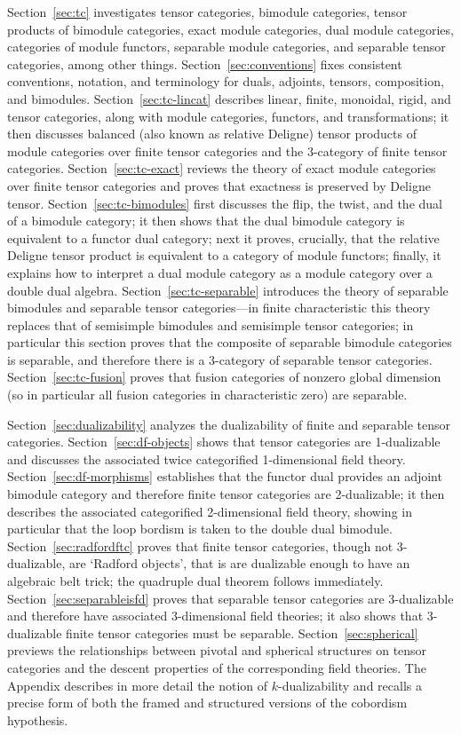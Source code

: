 \documentclass{amsart}
\begin{document}
Section~\ref{sec:tc} investigates tensor categories, bimodule categories, tensor products of bimodule categories, exact module categories, dual module categories, categories of module functors, separable module categories, and separable tensor categories, among other things.  Section~\ref{sec:conventions} fixes consistent conventions, notation, and terminology for duals, adjoints, tensors, composition, and bimodules.  Section~\ref{sec:tc-lincat} describes linear, finite, monoidal, rigid, and tensor categories, along with module categories, functors, and transformations; it then discusses balanced (also known as relative Deligne) tensor products of module categories over finite tensor categories and the 3-category of finite tensor categories.  Section~\ref{sec:tc-exact} reviews the theory of exact module categories over finite tensor categories and proves that exactness is preserved by Deligne tensor.  Section~\ref{sec:tc-bimodules} first discusses the flip, the twist, and the dual of a bimodule category; it then shows that the dual bimodule category is equivalent to a functor dual category; next it proves, crucially, that the relative Deligne tensor product is equivalent to a category of module functors; finally, it explains how to interpret a dual module category as a module category over a double dual algebra.  Section~\ref{sec:tc-separable} introduces the theory of separable bimodules and separable tensor categories---in finite characteristic this theory replaces that of semisimple bimodules and semisimple tensor categories; in particular this section proves that the composite of separable bimodule categories is separable, and therefore there is a 3-category of separable tensor categories.  Section~\ref{sec:tc-fusion} proves that fusion categories of nonzero global dimension (so in particular all fusion categories in characteristic zero) are separable.

Section~\ref{sec:dualizability} analyzes the dualizability of finite and separable tensor categories.  Section~\ref{sec:df-objects} shows that tensor categories are 1-dualizable and discusses the associated twice categorified 1-dimensional field theory.  Section~\ref{sec:df-morphisms} establishes that the functor dual provides an adjoint bimodule category and therefore finite tensor categories are 2-dualizable; it then describes the associated categorified 2-dimensional field theory, showing in particular that the loop bordism is taken to the double dual bimodule.  Section~\ref{sec:radfordftc} proves that finite tensor categories, though not 3-dualizable, are `Radford objects', that is are dualizable enough to have an algebraic belt trick; the quadruple dual theorem follows immediately.  Section~\ref{sec:separableisfd} proves that separable tensor categories are 3-dualizable and therefore have associated 3-dimensional field theories; it also shows that 3-dualizable finite tensor categories must be separable.  Section~\ref{sec:spherical} previews the relationships between pivotal and spherical structures on tensor categories and the descent properties of the corresponding field theories.  The Appendix describes in more detail the notion of $k$-dualizability and recalls a precise form of both the framed and structured versions of the cobordism hypothesis.
\end{document}
